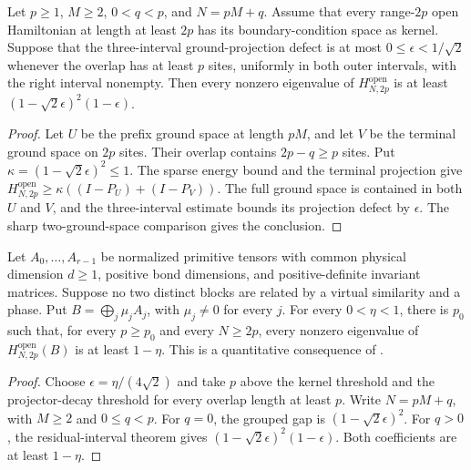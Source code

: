 \begin{lemma}
    \label{thm:sparse_grouped_terminal_open_gap}
    \leanok
    Let $p\geq1$, $M\geq2$, $0<q<p$, and $N=pM+q$.
    Assume that every range-$2p$ open Hamiltonian at length at least $2p$
    has its boundary-condition space as kernel. Suppose that the
    three-interval ground-projection defect is at most
    $0\leq\epsilon<1/\sqrt2$ whenever the overlap has at least $p$ sites,
    uniformly in both outer intervals, with the right interval nonempty.
    Then every nonzero eigenvalue of $H^{\mathrm{open}}_{N,2p}$ is at least
    $(1-\sqrt2\epsilon)^2(1-\epsilon)$.
\end{lemma}
\begin{proof}\leanok
    Let $U$ be the prefix ground space at length $pM$, and let $V$ be
    the terminal ground space on $2p$ sites. Their overlap contains
    $2p-q\geq p$ sites. Put $\kappa=(1-\sqrt2\epsilon)^2\leq1$.
    The sparse energy bound and the terminal projection give
    $H^{\mathrm{open}}_{N,2p}\geq\kappa((I-P_U)+(I-P_V))$.
    The full ground space is contained in both $U$ and $V$, and the
    three-interval estimate bounds its projection defect by $\epsilon$.
    The sharp two-ground-space comparison gives the conclusion.
\end{proof}

\begin{lemma}
    \label{thm:primitive_block_open_prescribed_gap}
    \leanok
    Let $A_0,\ldots,A_{r-1}$ be normalized primitive tensors with common
    physical dimension $d\geq1$, positive bond dimensions, and
    positive-definite invariant matrices. Suppose no two distinct blocks
    are related by a virtual similarity and a phase. Put
    $B=\bigoplus_j\mu_jA_j$, with $\mu_j\ne0$ for every $j$.
    For every $0<\eta<1$, there is $p_0$ such that, for every
    $p\geq p_0$ and every $N\geq2p$, every nonzero eigenvalue of
    $H^{\mathrm{open}}_{N,2p}(B)$ is at least $1-\eta$.
    This is a quantitative consequence of
    \cite[Theorem~2.1(ii) and Section~6]{Nachtergaele1996Spectral}.
\end{lemma}
\begin{proof}\leanok
    Choose $\epsilon=\eta/(4\sqrt2)$ and take $p$ above the kernel
    threshold and the projector-decay threshold for every overlap length
    at least $p$. Write $N=pM+q$, with $M\geq2$ and $0\leq q<p$.
    For $q=0$, the grouped gap is $(1-\sqrt2\epsilon)^2$.
    For $q>0$, the residual-interval theorem gives
    $(1-\sqrt2\epsilon)^2(1-\epsilon)$.
    Both coefficients are at least $1-\eta$.
\end{proof}

